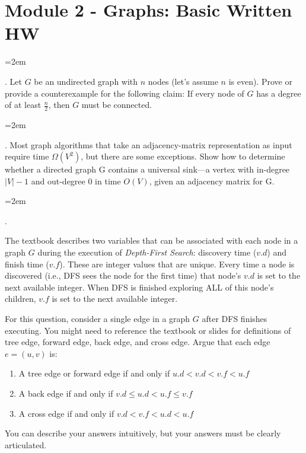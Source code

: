 \documentclass[12pt]{article}
\def\homework{Module 2 - Graphs: Basic Written HW}
\newcounter{quesnum}
\newcommand{\question}[2][??]{
\begin{list}{\labelitemi}{\leftmargin=2em}
\item [\arabic{quesnum}.] {#2}
\end{list}
\addtocounter{quesnum}{1}
}
\begin{document}
\section*{\homework}



\question[3]{
Let $G$ be an undirected graph with $n$ nodes (let's assume $n$ is even). Prove or provide a counterexample for the following claim: If every node of $G$ has a degree of at least $\frac{n}{2}$, then $G$ must be connected.
}



\question[3]{
Most graph algorithms that take an adjacency-matrix representation as input require time $\Omega(V^2)$, but there are some exceptions. Show how to determine whether a directed graph G contains a universal sink—a vertex with in-degree $|V| - 1$ and out-degree $0$ in time $O(V)$, given an adjacency matrix for G.
}




\question[1]{
The textbook describes two variables that can be associated with each node in a graph $G$ during the execution of \emph{Depth-First Search}: discovery time ($v.d$) and finish time ($v.f$). These are integer values that are unique. Every time a node is discovered (i.e., DFS sees the node for the first time) that node's $v.d$ is set to the next available integer. When DFS is finished exploring ALL of this node's children, $v.f$ is set to the next available integer.

For this question, consider a single edge in a graph $G$ after DFS finishes executing. You might need to reference the textbook or slides for definitions of tree edge, forward edge, back edge, and cross edge. Argue that each edge $e=(u,v)$ is:

\begin{enumerate}
\item A tree edge or forward edge if and only if $u.d < v.d < v.f < u.f$
\item A back edge if and only if $v.d \leq u.d < u.f \leq v.f$
\item A cross edge if and only if $v.d < v.f < u.d < u.f$
\end{enumerate}

You can describe your answers intuitively, but your answers must be clearly articulated.
}

\end{document}
